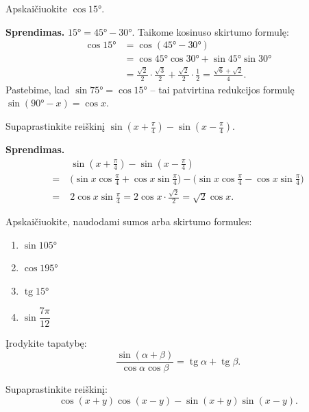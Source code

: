 \begin{example}
  Apskaičiuokite $\cos 15°$.

  \textbf{Sprendimas.} $15° = 45° - 30°$. Taikome kosinuso skirtumo formulę:
  \begin{align*}
    \cos 15° &= \cos(45°-30°) \\
             &= \cos 45°\cos 30° + \sin 45°\sin 30° \\
             &= \frac{\sqrt{2}}{2}\cdot\frac{\sqrt{3}}{2}
                + \frac{\sqrt{2}}{2}\cdot\frac{1}{2}
              = \frac{\sqrt{6}+\sqrt{2}}{4}.
  \end{align*}
  Pastebime, kad $\sin 75° = \cos 15°$ -- tai patvirtina redukcijos formulę
  $\sin(90°-x)=\cos x$.
\end{example}

\begin{example}
  Supaprastinkite reiškinį $\sin(x+\frac{\pi}{4}) - \sin(x-\frac{\pi}{4})$.

  \textbf{Sprendimas.}
  \begin{align*}
    &\sin\!\left(x+\tfrac{\pi}{4}\right) - \sin\!\left(x-\tfrac{\pi}{4}\right) \\
    =\; &\bigl(\sin x\cos\tfrac{\pi}{4}+\cos x\sin\tfrac{\pi}{4}\bigr)
         -\bigl(\sin x\cos\tfrac{\pi}{4}-\cos x\sin\tfrac{\pi}{4}\bigr) \\
    =\; &2\cos x\sin\tfrac{\pi}{4}
     = 2\cos x\cdot\frac{\sqrt{2}}{2} = \sqrt{2}\cos x.
  \end{align*}
\end{example}

\begin{exercise}
  Apskaičiuokite, naudodami sumos arba skirtumo formules:
  \begin{enumerate}[label=\alph*)]
    \item $\sin 105°$
    \item $\cos 195°$
    \item $\operatorname{tg} 15°$
    \item $\sin\dfrac{7\pi}{12}$
  \end{enumerate}
\end{exercise}

\begin{exercise}
  Įrodykite tapatybę:
  \[
    \frac{\sin(\alpha+\beta)}{\cos\alpha\cos\beta}
    = \operatorname{tg}\alpha + \operatorname{tg}\beta.
  \]
\end{exercise}

\begin{exercise}
  Supaprastinkite reiškinį:
  \[
    \cos(x+y)\cos(x-y) - \sin(x+y)\sin(x-y).
  \]
\end{exercise}

